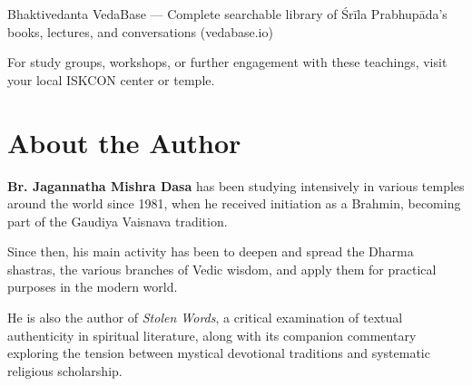 \documentclass[11pt,twoside]{book}
\begin{document}
Bhaktivedanta VedaBase — Complete searchable library of Śrīla Prabhupāda's books, lectures, and conversations (vedabase.io)

For study groups, workshops, or further engagement with these teachings, visit your local ISKCON center or temple.

\chapter*{About the Author}

\textbf{Br. Jagannatha Mishra Dasa} has been studying intensively in various temples around the world since 1981, when he received initiation as a Brahmin, becoming part of the Gaudiya Vaisnava tradition.

Since then, his main activity has been to deepen and spread the Dharma shastras, the various branches of Vedic wisdom, and apply them for practical purposes in the modern world.

He is also the author of \emph{Stolen Words}, a critical examination of textual authenticity in spiritual literature, along with its companion commentary exploring the tension between mystical devotional traditions and systematic religious scholarship.
\end{document}

